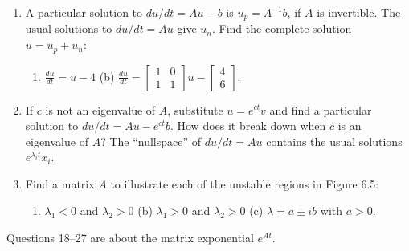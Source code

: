 \documentclass[14pt, a4paper]{article}
\begin{document}
\begin{enumerate}[resume]
    \item A particular solution to $du/dt = Au - b$ is $u_p = A^{-1}b$, if $A$ is invertible. The usual solutions to $du/dt = Au$ give $u_n$. Find the complete solution $u = u_p + u_n$:
          \begin{enumerate}
              \item $\frac{du}{dt} = u - 4$ \qquad (b) $\frac{du}{dt} = \begin{bmatrix} 1 & 0 \\ 1 & 1 \end{bmatrix} u - \begin{bmatrix} 4 \\ 6 \end{bmatrix}$.
          \end{enumerate}

    \item If $c$ is not an eigenvalue of $A$, substitute $u = e^{ct}v$ and find a particular solution to $du/dt = Au - e^{ct}b$. How does it break down when $c$ is an eigenvalue of $A$? The ``nullspace'' of $du/dt = Au$ contains the usual solutions $e^{\lambda_i t}x_i$.

    \item Find a matrix $A$ to illustrate each of the unstable regions in Figure 6.5:
          \begin{enumerate}
              \item $\lambda_1 < 0$ and $\lambda_2 > 0$ \qquad (b) $\lambda_1 > 0$ and $\lambda_2 > 0$ \qquad (c) $\lambda = a \pm ib$ with $a > 0$.
          \end{enumerate}
\end{enumerate}

\noindent Questions 18--27 are about the matrix exponential $e^{At}$.
\end{document}
